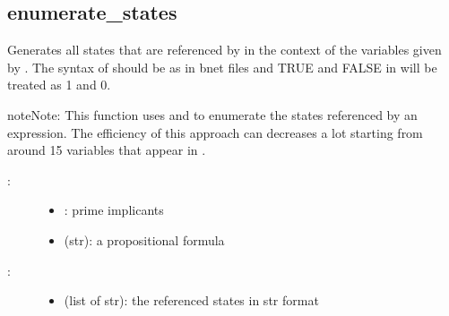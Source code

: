 \documentclass[letterpaper,10pt,english]{sphinxmanual}
\begin{document}
\subsection{enumerate\_states}
\label{\detokenize{StateTransitionGraphs:enumerate-states}}\label{\detokenize{StateTransitionGraphs:id16}}

\begin{fulllineitems}
\label{\detokenize{StateTransitionGraphs:PyBoolNet.StateTransitionGraphs.enumerate_states}}
Generates all states that are referenced by  in the context of the variables given by .
The syntax of  should be as in bnet files and TRUE and FALSE in will be treated as 1 and 0.

\begin{sphinxadmonition}{note}{Note:}
This function uses {\hyperref[\detokenize{FileExchange:bnet2primes}]{}} and {\hyperref[\detokenize{StateTransitionGraphs:list-states-in-subspace}]{}} to enumerate
the states referenced by an expression. The efficiency of this approach can decreases a lot starting from around 15 variables
that appear in .
\end{sphinxadmonition}
\begin{description}
\item[{:}] \leavevmode\begin{itemize}
\item {} 
: prime implicants

\item {} 
 (str): a propositional formula

\end{itemize}

\item[{:}] \leavevmode\begin{itemize}
\item {} 
 (list of str): the referenced states in str format

\end{itemize}

\end{description}


\end{fulllineitems}
\end{document}
